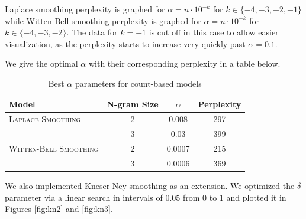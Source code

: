 \documentclass[11pt]{article}
\begin{document}
Laplace smoothing perplexity is graphed for $\alpha = n \cdot 10^{-k}$ for $k \in \{-4, -3, -2, -1\}$ while Witten-Bell smoothing perplexity is graphed for $\alpha = n \cdot 10^{-k}$ for $k \in \{-4, -3, -2\}$. The data for $k = -1$ is cut off in this case to allow easier visualization, as the perplexity starts to increase very quickly past $\alpha = 0.1$.  

We give the optimal $\alpha$ with their corresponding perplexity in a table below. 

\begin{table}[h]
  \centering
  \begin{tabular}{lccc}
    \toprule
    Model & N-gram Size & $\alpha$ & Perplexity \\
    \midrule
    \textsc{Laplace Smoothing} & 2 & 0.008 & 297 \\
    & 3 & 0.03 & 399 \\
    \textsc{Witten-Bell Smoothing} & 2 & 0.0007 & 215 \\
    & 3 & 0.0006 & 369 \\
    \bottomrule
  \end{tabular}
  \caption{\label{tab:alpha} Best $\alpha$ parameters for count-based models}
\end{table}

We also implemented Kneser-Ney smoothing as an extension. We optimized the $\delta$ parameter via a linear search in intervals of $0.05$ from $0$ to $1$ and plotted it in Figures \ref{fig:kn2} and \ref{fig:kn3}. 
\end{document}
